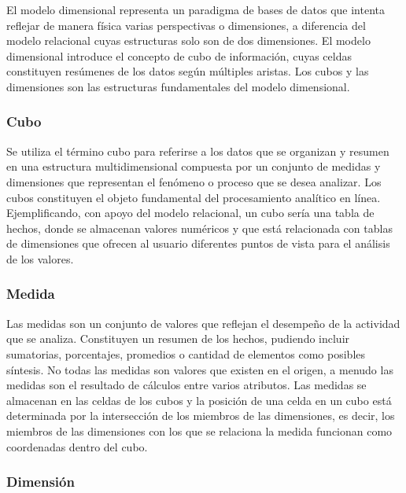 El modelo dimensional representa un paradigma de bases de datos que intenta reflejar de manera física varias perspectivas o dimensiones, 
a diferencia del modelo relacional cuyas estructuras solo son de dos dimensiones. El modelo dimensional introduce el concepto 
de cubo de información, cuyas celdas constituyen resúmenes de los datos según m\'ultiples aristas. Los cubos y las dimensiones 
son las estructuras fundamentales del modelo dimensional.


\subsubsection{Cubo}

Se utiliza el término cubo para referirse a los datos que se organizan y resumen en una estructura multidimensional compuesta 
por un conjunto de medidas y dimensiones que representan el fenómeno o proceso que se desea analizar. Los cubos constituyen 
el objeto fundamental del procesamiento analítico en línea\cite{lismaster}. Ejemplificando, con apoyo del modelo relacional, 
un cubo sería una tabla de hechos, donde se almacenan valores numéricos y que est\'a relacionada con tablas de dimensiones 
que ofrecen al usuario diferentes puntos de vista para el análisis de los valores.

\subsubsection{Medida}

Las medidas son un conjunto de valores que reflejan el desempeño de la actividad que se analiza. Constituyen un resumen de los 
hechos\cite{lismaster}, pudiendo incluir sumatorias, porcentajes, promedios o cantidad de elementos como posibles síntesis. 
No todas las medidas son valores que existen en el origen, a menudo las medidas son el resultado de cálculos entre 
varios atributos. Las medidas se almacenan en las celdas de los cubos y la posici\'on de una celda en un cubo est\'a determinada por la 
intersecci\'on de los miembros de las dimensiones, es decir, los miembros de las dimensiones con los que se relaciona la medida 
funcionan como coordenadas dentro del cubo.

\subsubsection{Dimensión}


